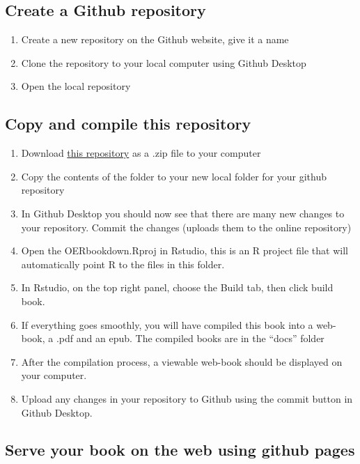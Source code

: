 \documentclass[]{book}
\providecommand{\tightlist}{%
  \setlength{\itemsep}{0pt}\setlength{\parskip}{0pt}}
\theoremstyle{definition}
\theoremstyle{definition}
\theoremstyle{definition}
\theoremstyle{remark}
\begin{document}
\subsection{Create a Github
repository}\label{create-a-github-repository}

\begin{enumerate}
\def\labelenumi{\arabic{enumi}.}
\setcounter{enumi}{5}
\tightlist
\item
  Create a new repository on the Github website, give it a name
\item
  Clone the repository to your local computer using Github Desktop
\item
  Open the local repository
\end{enumerate}

\subsection{Copy and compile this
repository}\label{copy-and-compile-this-repository}

\begin{enumerate}
\def\labelenumi{\arabic{enumi}.}
\setcounter{enumi}{8}
\tightlist
\item
  Download \href{https://github.com/CrumpLab/OER_bookdown}{this
  repository} as a .zip file to your computer
\item
  Copy the contents of the folder to your new local folder for your
  github repository
\item
  In Github Desktop you should now see that there are many new changes
  to your repository. Commit the changes (uploads them to the online
  repository)
\item
  Open the OERbookdown.Rproj in Rstudio, this is an R project file that
  will automatically point R to the files in this folder.
\item
  In Rstudio, on the top right panel, choose the Build tab, then click
  build book.
\item
  If everything goes smoothly, you will have compiled this book into a
  web-book, a .pdf and an epub. The compiled books are in the ``docs''
  folder
\item
  After the compilation process, a viewable web-book should be displayed
  on your computer.
\item
  Upload any changes in your repository to Github using the commit
  button in Github Desktop.
\end{enumerate}

\subsection{Serve your book on the web using github
pages}\label{serve-your-book-on-the-web-using-github-pages}
\end{document}
